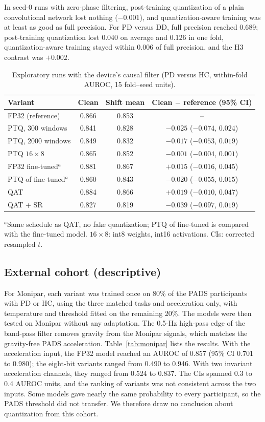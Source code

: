 \documentclass[preprint,12pt]{elsarticle}
\begin{document}
In seed-0 runs with zero-phase filtering, post-training quantization of a plain convolutional network lost nothing ($-0.001$), and quantization-aware training was at least as good as full precision. For PD versus DD, full precision reached 0.689; post-training quantization lost 0.040 on average and 0.126 in one fold, quantization-aware training stayed within 0.006 of full precision, and the H3 contrast was $+0.002$.

\begin{table}[!t]
\caption{Exploratory runs with the device's causal filter (PD versus HC, within-fold AUROC, 15 fold--seed units).}
\label{tab:explore}
\centering\small
\begin{tabular}{@{}lccc@{}}
\toprule
Variant & Clean & Shift mean & Clean $-$ reference (95\% CI) \\
\midrule
FP32 (reference) & 0.866 & 0.853 & -- \\
PTQ, 300 windows & 0.841 & 0.828 & $-0.025$ ($-0.074$, $0.024$) \\
PTQ, 2000 windows & 0.849 & 0.832 & $-0.017$ ($-0.053$, $0.019$) \\
PTQ $16\times8$ & 0.865 & 0.852 & $-0.001$ ($-0.004$, $0.001$) \\
FP32 fine-tuned$^{a}$ & 0.881 & 0.867 & $+0.015$ ($-0.016$, $0.045$) \\
PTQ of fine-tuned$^{a}$ & 0.860 & 0.843 & $-0.020$ ($-0.055$, $0.015$) \\
QAT & 0.884 & 0.866 & $+0.019$ ($-0.010$, $0.047$) \\
QAT + SR & 0.827 & 0.819 & $-0.039$ ($-0.097$, $0.019$) \\
\bottomrule
\end{tabular}

\vspace{2pt}\parbox{\linewidth}{\footnotesize $^{a}$Same schedule as QAT, no fake quantization; PTQ of fine-tuned is compared with the fine-tuned model. $16\times8$: int8 weights, int16 activations. CIs: corrected resampled $t$.}
\end{table}

\subsection{External cohort (descriptive)}
For Monipar, each variant was trained once on 80\% of the PADS participants with PD or HC, using the three matched tasks and acceleration only, with temperature and threshold fitted on the remaining 20\%. The models were then tested on Monipar without any adaptation. The 0.5-Hz high-pass edge of the band-pass filter removes gravity from the Monipar signals, which matches the gravity-free PADS acceleration. Table~\ref{tab:monipar} lists the results. With the acceleration input, the FP32 model reached an AUROC of 0.857 (95\% CI 0.701 to 0.980); the eight-bit variants ranged from 0.490 to 0.946. With two invariant acceleration channels, they ranged from 0.524 to 0.837. The CIs spanned 0.3 to 0.4 AUROC units, and the ranking of variants was not consistent across the two inputs. Some models gave nearly the same probability to every participant, so the PADS threshold did not transfer. We therefore draw no conclusion about quantization from this cohort.
\end{document}
